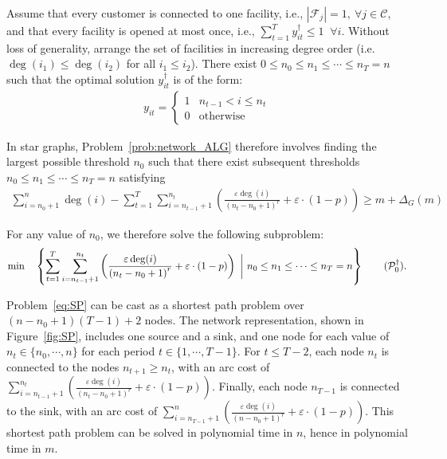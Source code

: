 \documentclass[nonblindrev]{informs3noheader}
\def\calC{\mathcal{C}}
\def\calF{\mathcal{F}}
\def\calP{\mathcal{P}}
\begin{document}
\begin{corollary}\label{cor:small_first}
Assume that every customer is connected to one facility, i.e., $|\calF_j|=1,\ \forall j\in\calC$, and that every facility is opened at most once, i.e., $\sum_{t=1}^T y_{it}^\dagger \leq 1 \;\;\forall i$. Without loss of generality, arrange the set of facilities in increasing degree order (i.e. $\deg(i_1)\leq \deg(i_2)$ for all $i_1\leq i_2$). There exist $0\leq n_0\leq n_1 \leq \cdots \leq n_T=n$ such that the optimal solution $y_{it}^\dagger$ is of the form:
    \begin{align*}
        y_{it}=\begin{cases}
            1 & n_{t-1}<i \leq n_{t} \\
            0 & \text{otherwise}
        \end{cases}
    \end{align*}
\end{corollary}

In star graphs, Problem~\eqref{prob:network_ALG} therefore involves finding the largest possible threshold $n_0$ such that there exist subsequent thresholds $n_0\leq n_1 \leq \cdots \leq n_T=n$ satisfying
\begin{align*}
    \sum_{i=n_0+1}^n \deg(i)-\sum_{t=1}^T\sum_{i=n_{t-1}+1}^{n_t}\left(\frac{\varepsilon \deg(i)}{\left(n_{t}-n_0 +1\right)^r}+\varepsilon\cdot(1-p)\right)\geq m+\Delta_G(m)
\end{align*}

For any value of $n_0$, we therefore solve the following subproblem:
\begin{equation}\label{eq:SP}
    \min\quad\left\{\sum_{t=1}^T\sum_{i=n_{t-1}+1}^{n_t}\left(\frac{\varepsilon\deg(i)}{\left(n_{t}-n_0 +1\right)^r}+\varepsilon\cdot(1-p)\right)\ \bigg|\ n_0\leq n_1 \leq \cdots \leq n_T=n\right\}\tag{$\calP_0^\dagger$}.
\end{equation}

Problem~\eqref{eq:SP} can be cast as a shortest path problem over $(n-n_0+1)(T-1)+2$ nodes. The network representation, shown in Figure~\ref{fig:SP}, includes one source and a sink, and one node for each value of $n_t\in\{n_0,\cdots,n\}$ for each period $t\in\{1,\cdots,T-1\}$. For $t\leq T-2$, each node $n_t$ is connected to the nodes $n_{t+1}\geq n_t$, with an arc cost of $\sum_{i=n_{t-1}+1}^{n_t}\left(\frac{\varepsilon\deg(i)}{\left(n_{t}-n_0 +1\right)^r}+\varepsilon\cdot(1-p)\right)$. Finally, each node $n_{T-1}$ is connected to the sink, with an arc cost of $\sum_{i=n_{T-1}+1}^{n}\left(\frac{\varepsilon\deg(i)}{\left(n-n_0 +1\right)^r}+\varepsilon\cdot(1-p)\right)$. This shortest path problem can be solved in polynomial time in $n$, hence in polynomial time in $m$.
\end{document}
